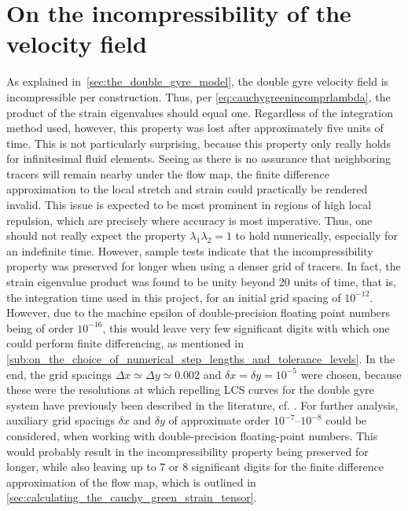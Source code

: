 \section{On the incompressibility of the velocity field}
\label{sec:on_the_incompressibility_of_the_velocity_field}

As explained in~\cref{sec:the_double_gyre_model}, the double gyre velocity field
is incompressible per construction. Thus, per
\cref{eq:cauchygreenincomprlambda}, the product of the strain eigenvalues
should equal one. Regardless of the integration method used, however, this
property was lost after approximately five units of time. This is not
particularly surprising, because this property only really holds for
infinitesimal fluid elements. Seeing as there is no assurance that neighboring
tracers will remain nearby under the flow map, the finite difference
approximation to the local stretch and strain could practically be rendered
invalid. This issue is expected to be most prominent in regions of high local
repulsion, which are precisely where accuracy is most imperative.
\clearpage
Thus, one should not really expect the property $\lambda_{1}\lambda_{2}=1$ to
hold numerically, especially for an indefinite time. However, sample tests
indicate that the incompressibility property was preserved for longer when
using a denser grid of tracers. In fact, the strain eigenvalue product was
found to be unity beyond 20 units of time, that is, the integration time used in
this project, for an initial grid spacing of $10^{-12}$. However, due to the
machine epsilon of double-precision floating point numbers being of order
$10^{-16}$, this would leave very few significant digits with which one could
perform finite differencing, as mentioned in
\cref{sub:on_the_choice_of_numerical_step_lengths_and_tolerance_levels}.
In the end, the grid spacings $\Delta{x}\simeq\Delta{y}\simeq0.002$
and $\delta{x}=\delta{y}=10^{-5}$ were chosen, because these were the
resolutions at which repelling LCS curves for the double
gyre system have previously been described in the literature, cf.
\textcite{farazmand2012computing}. For further analysis, auxiliary grid spacings
$\delta{x}$ and $\delta{y}$ of approximate order $10^{-7}$--$10^{-8}$ could be
considered, when working with double-precision floating-point numbers. This
would probably result in the incompressibility property being preserved for
longer, while also leaving up to 7 or 8 significant digits for the finite
difference approximation of the flow map, which is outlined in
\cref{sec:calculating_the_cauchy_green_strain_tensor}.

